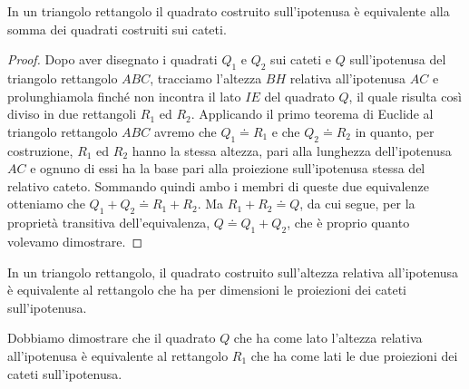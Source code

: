 \begin{teorema}[di Pitagora]
In un triangolo rettangolo il quadrato costruito sull'ipotenusa è 
equivalente alla somma dei quadrati costruiti sui cateti.
\end{teorema}

\noindent\begin{minipage}{0.55\textwidth}\parindent15pt
\begin{proof}
Dopo aver disegnato i quadrati \(Q_1\) e \(Q_2\) sui cateti e \(Q\) 
sull'ipotenusa del triangolo rettangolo \(ABC\), tracciamo l'altezza 
\(BH\) relativa all'ipotenusa \(AC\) e prolunghiamola finché non incontra 
il lato \(IE\) del quadrato \(Q\), il quale risulta così diviso in due 
rettangoli \(R_1\) ed \(R_2\).
Applicando il primo teorema di Euclide al triangolo rettangolo \(ABC\) 
avremo che \(Q_1\doteq R_1\) e che \(Q_2\doteq R_2\) in quanto, per 
costruzione, \(R_1\) ed \(R_2\) hanno la stessa altezza, pari alla 
lunghezza dell'ipotenusa \(AC\) e ognuno di essi ha la base pari alla 
proiezione sull'ipotenusa stessa del relativo cateto. Sommando quindi 
ambo i membri di queste due equivalenze otteniamo che \(Q_1+Q_2\doteq 
R_1+R_2\). Ma \(R_1+R_2\doteq Q\), da cui segue, per la proprietà 
transitiva dell'equivalenza, \(Q\doteq Q_1+Q_2\), che è proprio quanto 
volevamo dimostrare.
\end{proof}
\end{minipage}\hfil
\begin{minipage}{0.45\textwidth}
  \centering
\end{minipage}\vspace{8pt}


\begin{teorema}
In un triangolo rettangolo, il quadrato costruito sull'altezza 
relativa all'ipotenusa è equivalente al rettangolo che ha per 
dimensioni le proiezioni dei cateti sull'ipotenusa.
\end{teorema}

Dobbiamo dimostrare che il quadrato \(Q\) che ha come lato l'altezza 
relativa all'ipotenusa è equivalente al rettangolo \(R_1\) che ha come 
lati le due proiezioni dei cateti sull'ipotenusa.

